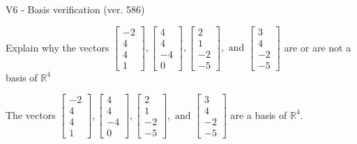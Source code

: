 \begin{exercise}
  \begin{exerciseTitle}V6 - Basis verification (ver. 586)\end{exerciseTitle}
  \begin{exerciseStatement}
    Explain why the vectors \(\left[\begin{array}{r}
-2 \\
4 \\
4 \\
1
\end{array}\right] , \left[\begin{array}{r}
4 \\
4 \\
-4 \\
0
\end{array}\right] , \left[\begin{array}{r}
2 \\
1 \\
-2 \\
-5
\end{array}\right] , \text{ and } \left[\begin{array}{r}
3 \\
4 \\
-2 \\
-5
\end{array}\right]\) are or are not a basis of \(\mathbb{R}^4\)	


  \end{exerciseStatement}
  \begin{exerciseAnswer}
   The vectors \(\left[\begin{array}{r}
-2 \\
4 \\
4 \\
1
\end{array}\right] , \left[\begin{array}{r}
4 \\
4 \\
-4 \\
0
\end{array}\right] , \left[\begin{array}{r}
2 \\
1 \\
-2 \\
-5
\end{array}\right] , \text{ and } \left[\begin{array}{r}
3 \\
4 \\
-2 \\
-5
\end{array}\right]\) 
  	 are  a basis of \(\mathbb{R}^4\).
  


  \end{exerciseAnswer}
\end{exercise}